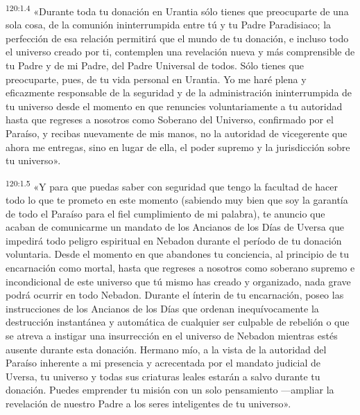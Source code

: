 \par
\textsuperscript{120:1.4} «Durante toda tu donación en Urantia sólo tienes que preocuparte de una sola cosa, de la comunión ininterrumpida entre tú y tu Padre Paradisiaco; la perfección de esa relación permitirá que el mundo de tu donación, e incluso todo el universo creado por ti, contemplen una revelación nueva y más comprensible de tu Padre y de mi Padre, del Padre Universal de todos. Sólo tienes que preocuparte, pues, de tu vida personal en Urantia. Yo me haré plena y eficazmente responsable de la seguridad y de la administración ininterrumpida de tu universo desde el momento en que renuncies voluntariamente a tu autoridad hasta que regreses a nosotros como Soberano del Universo, confirmado por el Paraíso, y recibas nuevamente de mis manos, no la autoridad de vicegerente que ahora me entregas, sino en lugar de ella, el poder supremo y la jurisdicción sobre tu universo».

\par
\textsuperscript{120:1.5} «Y para que puedas saber con seguridad que tengo la facultad de hacer todo lo que te prometo en este momento (sabiendo muy bien que soy la garantía de todo el Paraíso para el fiel cumplimiento de mi palabra), te anuncio que acaban de comunicarme un mandato de los Ancianos de los Días de Uversa que impedirá todo peligro espiritual en Nebadon durante el período de tu donación voluntaria. Desde el momento en que abandones tu conciencia, al principio de tu encarnación como mortal, hasta que regreses a nosotros como soberano supremo e incondicional de este universo que tú mismo has creado y organizado, nada grave podrá ocurrir en todo Nebadon. Durante el ínterin de tu encarnación, poseo las instrucciones de los Ancianos de los Días que ordenan inequívocamente la destrucción instantánea y automática de cualquier ser culpable de rebelión o que se atreva a instigar una insurrección en el universo de Nebadon mientras estés ausente durante esta donación. Hermano mío, a la vista de la autoridad del Paraíso inherente a mi presencia y acrecentada por el mandato judicial de Uversa, tu universo y todas sus criaturas leales estarán a salvo durante tu donación. Puedes emprender tu misión con un solo pensamiento ---ampliar la revelación de nuestro Padre a los seres inteligentes de tu universo».

